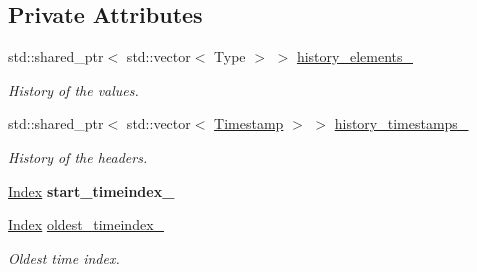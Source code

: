 \subsection*{Private Attributes}
\begin{DoxyCompactItemize}
\item 
\mbox{\label{classreal__time__tools_1_1ThreadsafeTimeseries_ac23cd95c9d5f6344e20db8d318f23005}} 
std\+::shared\+\_\+ptr$<$ std\+::vector$<$ Type $>$ $>$ \hyperlink{classreal__time__tools_1_1ThreadsafeTimeseries_ac23cd95c9d5f6344e20db8d318f23005}{history\+\_\+elements\+\_\+}
\begin{DoxyCompactList}\small\item\em History of the values. \end{DoxyCompactList}\item 
\mbox{\label{classreal__time__tools_1_1ThreadsafeTimeseries_a7f90089325fee66a71a413e68f8ab02c}} 
std\+::shared\+\_\+ptr$<$ std\+::vector$<$ \hyperlink{classreal__time__tools_1_1ThreadsafeTimeseries_a41e36f99889a580ce56491e573fa77b0}{Timestamp} $>$ $>$ \hyperlink{classreal__time__tools_1_1ThreadsafeTimeseries_a7f90089325fee66a71a413e68f8ab02c}{history\+\_\+timestamps\+\_\+}
\begin{DoxyCompactList}\small\item\em History of the headers. \end{DoxyCompactList}\item 
\mbox{\label{classreal__time__tools_1_1ThreadsafeTimeseries_aa05382a6a6288769cade6f02a25d5d11}} 
\hyperlink{classreal__time__tools_1_1ThreadsafeTimeseries_a9364696c534468d7ad927883b16ca981}{Index} {\bfseries start\+\_\+timeindex\+\_\+}
\item 
\mbox{\label{classreal__time__tools_1_1ThreadsafeTimeseries_a07285b5905c1b4c73830a4f69dbd306b}} 
\hyperlink{classreal__time__tools_1_1ThreadsafeTimeseries_a9364696c534468d7ad927883b16ca981}{Index} \hyperlink{classreal__time__tools_1_1ThreadsafeTimeseries_a07285b5905c1b4c73830a4f69dbd306b}{oldest\+\_\+timeindex\+\_\+}
\begin{DoxyCompactList}\small\item\em Oldest time index. \end{DoxyCompactList}\item 

\end{DoxyCompactItemize}
